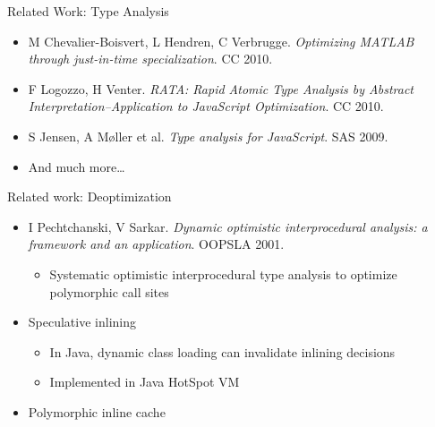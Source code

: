 \begin{frame}{Related Work: Type Analysis}
    \begin{itemize}
        \item M Chevalier-Boisvert, L Hendren, C Verbrugge. \textit{Optimizing
        MATLAB through just-in-time specialization}. CC 2010.
        \item F Logozzo, H Venter. \textit{RATA: Rapid Atomic Type Analysis by
        Abstract Interpretation–Application to JavaScript Optimization}. CC
        2010.
        \item S Jensen, A M\o{}ller et al. \textit{Type analysis for JavaScript}. SAS 2009.
        \item And much more\ldots
    \end{itemize}
\end{frame}

\begin{frame}{Related work: Deoptimization}
    \begin{itemize}
        \item I Pechtchanski, V Sarkar. \textit{Dynamic optimistic
            interprocedural analysis: a framework and an application}. OOPSLA 2001.
        \begin{itemize}
            \item Systematic optimistic interprocedural type analysis to optimize polymorphic call sites
        \end{itemize}
        \item Speculative inlining
        \begin{itemize}
            \item In Java, dynamic class loading can invalidate inlining decisions
            \item Implemented in Java HotSpot VM
        \end{itemize}
        \item Polymorphic inline cache
    \end{itemize}
\end{frame}

